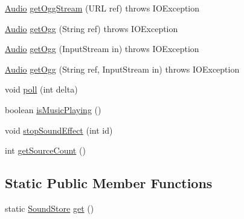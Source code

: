 \begin{DoxyCompactItemize}
\item 
\mbox{\hyperlink{interfaceorg_1_1newdawn_1_1slick_1_1openal_1_1_audio}{Audio}} \mbox{\hyperlink{classorg_1_1newdawn_1_1slick_1_1openal_1_1_sound_store_a613504c1c1d42980a936f02701fc1433}{get\+Ogg\+Stream}} (U\+RL ref)  throws I\+O\+Exception 
\item 
\mbox{\hyperlink{interfaceorg_1_1newdawn_1_1slick_1_1openal_1_1_audio}{Audio}} \mbox{\hyperlink{classorg_1_1newdawn_1_1slick_1_1openal_1_1_sound_store_a75fa2225dccc26b91963964706a18098}{get\+Ogg}} (String ref)  throws I\+O\+Exception 
\item 
\mbox{\hyperlink{interfaceorg_1_1newdawn_1_1slick_1_1openal_1_1_audio}{Audio}} \mbox{\hyperlink{classorg_1_1newdawn_1_1slick_1_1openal_1_1_sound_store_a437f61ed5f5058a084a0f495b2209919}{get\+Ogg}} (Input\+Stream in)  throws I\+O\+Exception 
\item 
\mbox{\hyperlink{interfaceorg_1_1newdawn_1_1slick_1_1openal_1_1_audio}{Audio}} \mbox{\hyperlink{classorg_1_1newdawn_1_1slick_1_1openal_1_1_sound_store_af221f2a8f9609b20c1559f750da7044c}{get\+Ogg}} (String ref, Input\+Stream in)  throws I\+O\+Exception 
\item 
void \mbox{\hyperlink{classorg_1_1newdawn_1_1slick_1_1openal_1_1_sound_store_a2caa14c79542517274b38747d047c33e}{poll}} (int delta)
\item 
boolean \mbox{\hyperlink{classorg_1_1newdawn_1_1slick_1_1openal_1_1_sound_store_a8202e82776ebeb24d157894100fea37b}{is\+Music\+Playing}} ()
\item 
void \mbox{\hyperlink{classorg_1_1newdawn_1_1slick_1_1openal_1_1_sound_store_a2da588724af2aac64706304f863b5634}{stop\+Sound\+Effect}} (int id)
\item 
int \mbox{\hyperlink{classorg_1_1newdawn_1_1slick_1_1openal_1_1_sound_store_a7ac0185b28b942ded76f97ac2c93a833}{get\+Source\+Count}} ()
\end{DoxyCompactItemize}
\subsection*{Static Public Member Functions}
\begin{DoxyCompactItemize}
\item 
static \mbox{\hyperlink{classorg_1_1newdawn_1_1slick_1_1openal_1_1_sound_store}{Sound\+Store}} \mbox{\hyperlink{classorg_1_1newdawn_1_1slick_1_1openal_1_1_sound_store_a826b5faeb77b23d9d93cb47824a8c854}{get}} ()
\end{DoxyCompactItemize}
